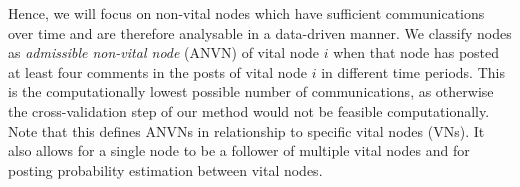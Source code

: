 Hence, we will focus on non-vital nodes which have sufficient communications over time and are therefore analysable in a data-driven manner. We classify nodes as \emph{admissible non-vital node} (ANVN) of vital node $i$ when that node has posted at least four comments in the posts of vital node $i$ in different time periods. This is the computationally lowest possible number of communications, as otherwise the cross-validation step of our method would not be feasible computationally. Note that this defines ANVNs in relationship to specific vital nodes (VNs). It also allows for a single node to be a follower of multiple vital nodes and for posting probability estimation between vital nodes. 




